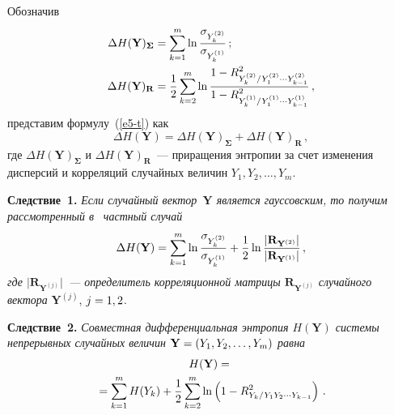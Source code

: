 \begin{multicols}{2}
  
  Обозначив 
  \begin{align*}
  \Delta H(\mathbf{Y})_{\boldsymbol{\Sigma}} &= \sum\limits_{k=1}^m \ln 
\displaystyle\frac{\displaystyle \sigma_{Y_k^{(2)}}\mathstrut}{\displaystyle \sigma_{Y_k^{(1)}}\mathstrut}\,;\\
  \Delta H(\mathbf{Y})_{\mathbf{R}} &= \displaystyle\frac{\displaystyle 1\mathstrut}{\displaystyle 2\mathstrut}\sum\limits_{k=2}^m \ln \displaystyle\frac{\displaystyle 1-
R^2_{Y_k^{(2)}/Y_1^{(2)}\cdots Y_{k-1}^{(2)}}\mathstrut}{\displaystyle 1-
R^2_{Y_k^{(1)}/Y_1^{(1)}\cdots Y_{k-1}^{(1)}}\mathstrut}\,,
  \end{align*}  
  представим формулу~(\ref{e5-t}) как
  \begin{equation}
  \Delta H(\mathbf{Y}) =\Delta H(\mathbf{Y})_{\boldsymbol{\Sigma}}+\Delta 
H(\mathbf{Y})_{\mathbf{R}}\,,
  \label{e8-t}
  \end{equation}
  где $\Delta H(\mathbf{Y})_{\boldsymbol{\Sigma}}$ и $\Delta H(\mathbf{Y})_{\mathbf{R}}$~--- 
приращения энтропии за счет изменения дисперсий и корреляций случайных 
величин $Y_1,Y_2,\ldots , Y_m$.
  
  \medskip
  
  \noindent
  \textbf{Следствие~1.} \textit{Если случайный вектор~$\mathbf{Y}$ является 
гауссовским, то получим рассмотренный в}~\cite{13-t} \textit{частный случай}
  \begin{equation}
  \Delta H(\mathbf{Y}) =\sum\limits_{k=1}^m \ln 
\displaystyle\frac{\displaystyle \sigma_{Y_k^{(2)}}\mathstrut}{\displaystyle \sigma_{Y_k^{(1)}}\mathstrut} +\displaystyle\frac{\displaystyle 1\mathstrut}{\displaystyle 2\mathstrut}\ln \displaystyle\frac{\displaystyle \vert 
\mathbf{R}_{\mathbf{Y}^{(2)}}\vert\mathstrut}{\displaystyle \vert \mathbf{R}_{\mathbf{Y}^{(1)}}\vert\mathstrut}\,,
  \label{e9-t}
  \end{equation}
  \textit{где $\vert \mathbf{R}_{\mathbf{Y}^{(j)}}\vert$~--- определитель 
корреляционной матрицы $\mathbf{R}_{\mathbf{Y}^{(j)}}$ случайного вектора} 
$\mathbf{Y}^{(j)}$, $j\hm=1, 2$.
  
  \medskip
  
  \noindent
  \textbf{Следствие~2.} \textit{Совместная дифференциальная энтропия 
$H(\mathbf{Y})$ системы непрерывных случайных величин $\mathbf{Y}\hm= 
(Y_1,Y_2,\ldots , Y_m)$ равна}
  \begin{multline}
  H(\mathbf{Y}) ={}\\
  {}=\sum\limits_{k=1}^m H(Y_k) +\displaystyle\frac{\displaystyle 1\mathstrut}{\displaystyle 2\mathstrut} \sum\limits_{k=2}^m \ln 
\left (1-R^2_{Y_k/Y_1Y_2\cdots Y_{k-1}}\right)\,.
  \label{e10-t}
  \end{multline}
  
  \medskip
  

\end{multicols}
